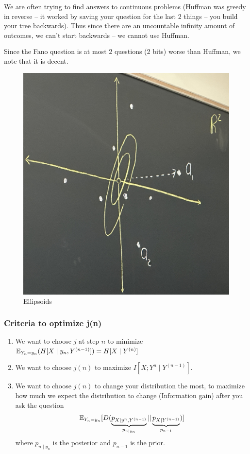 We are often trying to find answers to continuous problems (Huffman was greedy in reverse --  it worked by saving your question for the last 2 things -- you build your tree backwards). Thus since there are an uncountable infinity amount of outcomes, we can't start backwards -- we cannot use Huffman.

Since the Fano question is at most 2 questions (2 bits) worse than Huffman, we note that it is decent.

\begin{figure}[H]
    \centering
    \includegraphics[scale=0.1]{lectures/wk10/img/ellipsoids.jpeg}
    \caption{Ellipsoids}
    \label{fig:ellipsoid}
\end{figure}

\subsubsection{Criteria to optimize j(n)}
\begin{enumerate}
    \item We want to choose $j$ at step $n$ to minimize $\mathbb{E}_{Y_n = y_n}(H[X\mid y_n, Y^{(n-1)}])=H[X\mid Y^{(n)}]$
    \item We want to choose $j(n)$ to maximize $I[X; Y^n \mid Y^{(n-1)}]$.
    \item We want to choose $j(n)$ to change your distribution the most, to maximize how much we expect the distribution to change (Information gain) after you ask the question $$\mathbb{E}_{Y_n = y_n}[D(\underbrace{p_{X\mid y^n, Y^{(n-1)}}}_{p_{n\mid y_n}} \| \underbrace{p_{X\mid Y^{(n-1)}}}_{p_{n-1}})]$$ where $p_{n\mid y_n}$ is the posterior and $p_{n-1}$ is the prior.
\end{enumerate}

